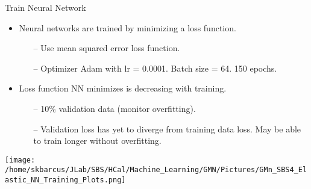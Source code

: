 \documentclass[10pt]{beamer}
\begin{document}
\begin{frame}{Train Neural Network}

	\vspace{-1mm}
	\begin{itemize}
		\item \alert{Neural networks are  trained by minimizing a loss function.}
			\begin{itemize}
				\item[--] Use mean squared error loss function.
				\item[--] Optimizer Adam with lr = 0.0001. Batch size = 64. 150 epochs.
			\end{itemize}
		\item Loss function NN minimizes is decreasing with training.
		\begin{itemize}
			\item[--] 10\% validation data (monitor overfitting).
			\item[--] \alert{Validation loss has yet to diverge from training data loss. May be able to train longer without overfitting.}
		\end{itemize}
	\end{itemize}
	
	\vspace{-3mm}
	\begin{center}
    		\texttt{[image: /home/skbarcus/JLab/SBS/HCal/Machine\_Learning/GMN/Pictures/GMn\_SBS4\_Elastic\_NN\_Training\_Plots.png]}
    	\end{center}
	
\end{frame}
\end{document}
